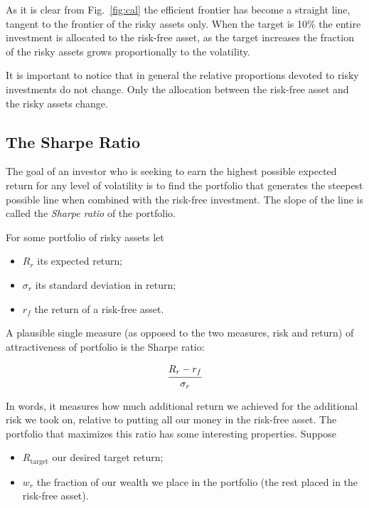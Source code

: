 As it is clear from Fig.~\ref{fig:cal} the efficient frontier has become a straight line, tangent to the frontier of the risky assets only. When the target is 10\% the entire investment is allocated to the risk-free asset, as the target increases the fraction of the risky assets grows
proportionally to the volatility. 

It is important to notice that in general the relative proportions devoted to risky investments do not change. Only the allocation between the risk-free asset and the risky assets change.

\subsection{The Sharpe Ratio}
\label{the-sharpe-ratio}
The goal of an investor who is seeking to earn the highest possible expected return for any level of volatility is to find the portfolio that generates the steepest possible line when combined with the risk-free investment. The slope of the line is called the \emph{Sharpe ratio} of the portfolio.

For some portfolio of risky assets let 

\begin{itemize}
\tightlist
\item
  \(R_r\) its expected return;
\item
  \(\sigma_r\) its standard deviation in return;
\item
  \(r_f\) the return of a risk-free asset.
\end{itemize}

A plausible single measure (as opposed to the two measures, risk and return) of attractiveness of portfolio is the Sharpe ratio:

\begin{equation} \cfrac{R_r - r_f}{\sigma_r} \end{equation}

In words, it measures how much additional return we achieved for the additional risk we took on, relative to putting all our money in the risk-free asset. The portfolio that maximizes this ratio has some interesting properties. Suppose 

\begin{itemize}
\tightlist
\item
  \(R_\textrm{target}\) our desired target return;
\item
  \(w_r\) the fraction of our wealth we place in the portfolio (the
  rest placed in the risk-free asset).
\end{itemize}

